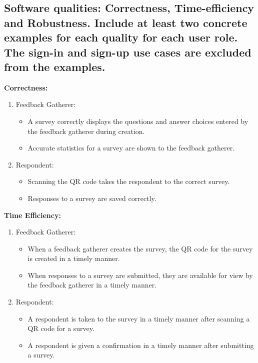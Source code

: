 \documentclass[letterpaper, 12 pt, conference]{ieeeconf}
\begin{document}
\subsection{Software qualities: Correctness, Time-eﬀiciency and Robustness. Include at least two concrete examples for each quality for each user role. The sign-in and sign-up use cases are excluded from the examples.}
\linebreak
    \hfill \break
\textbf{Correctness:}
\begin{enumerate}
    \item[] Feedback Gatherer:
    \begin{itemize}
        \item A survey correctly displays the questions and answer choices entered by the feedback gatherer during creation. 
        \item Accurate statistics for a survey are shown to the feedback gatherer.
    \end{itemize}
    \item[] Respondent:
    \begin{itemize}
        \item Scanning the QR code takes the respondent to the correct survey.
        \item Responses to a survey are saved correctly.
    \end{itemize}
\end{enumerate}
\hfill \break

\textbf{Time Efficiency:}
\begin{enumerate}
    \item[] Feedback Gatherer:
    \begin{itemize}
        \item  When a feedback gatherer creates the survey, the QR code for the survey is created in a timely manner.
        \item When responses to a survey are submitted, they are available for view by the feedback gatherer in a timely manner.
    \end{itemize}
    \item[] Respondent:
    \begin{itemize}
        \item A respondent is taken to the survey in a timely manner after scanning a QR code for a survey.
        \item A respondent is given a confirmation in a timely manner after submitting a survey.
    \end{itemize}
\end{enumerate}
\end{document}
